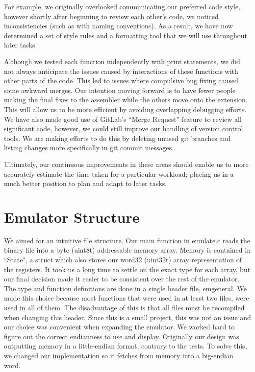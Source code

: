 \documentclass[]{article}
\begin{document}
For example, we originally overlooked communicating our preferred code style, however shortly after beginning to review each other's code, we noticed inconsistencies (such as with naming conventions). As a result, we have now determined a set of style rules and a formatting tool that we will use throughout later tasks.

\vspace{3mm}

 Although we tested each function independently with print statements, we did not always anticipate the issues caused by interactions of these functions with other parts of the code. This led to issues where compulsive bug fixing caused some awkward merges. Our intention moving forward is to have fewer people making the final fixes to the assembler while the others move onto the extension. This will allow us to be more efficient by avoiding overlapping debugging efforts. We have also made good use of GitLab's ``Merge Request" feature to review all significant code, however, we could still improve our handling of version control tools. We are making efforts to do this by deleting unused git branches and listing changes more specifically in git commit messages.

\vspace{3mm}

Ultimately, our continuous improvements in these areas should enable us to more accurately estimate the time taken for a particular workload; placing us in a much better position to plan and adapt to later tasks.

\newpage
\section*{Emulator Structure}

We aimed for an intuitive file structure. Our main function in emulate.c reads the binary file into a byte (uint8\textunderscore t) addressable memory array. Memory is contained in ``State", a struct which also stores our word32 (uint32\textunderscore t) array representation of the registers. It took us a long time to settle on the exact type for each array, but our final decision made it easier to be consistent over the rest of the emulator. The type and function definitions are done in a single header file, em\textunderscore general. We made this choice because most functions that were used in at least two files, were used in all of them. The disadvantage of this is that all files must be recompiled when changing this header. Since this is a small project, this was not an issue and our choice was convenient when expanding the emulator. We worked hard to figure out the correct endianness to use and display. Originally our design was outputting memory in a little-endian format, contrary to the tests. To solve this, we changed our implementation so it fetches from memory into a big-endian word.
\end{document}
